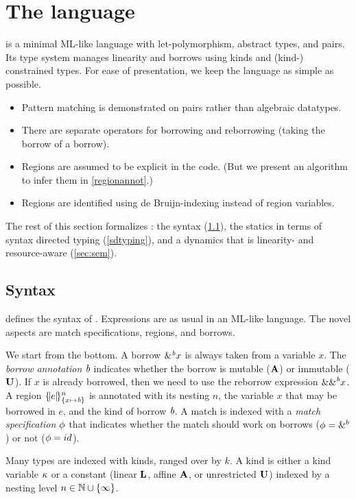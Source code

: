 \section{The \lang language}

\lang is a minimal ML-like language with
let-polymorphism, abstract types, and pairs. Its type system manages
linearity and borrows using kinds and (kind-) constrained types.
For ease of presentation, we keep the language as simple as possible.
\begin{itemize}
\item Pattern matching is demonstrated on pairs rather than algebraic
  datatypes.
\item There are separate operators for borrowing and reborrowing (taking
  the borrow of a borrow).
\item Regions are assumed to be explicit in the code. (But we present
  an algorithm to infer them in \cref{regionannot}.)
\item Regions are identified using de Bruijn-indexing instead of region
  variables. 
\end{itemize}

The rest of this section formalizes  \lang: the syntax (\cref{syntax}),
the statics in terms of syntax directed typing (\cref{sdtyping}),
and a dynamics that is linearity- and resource-aware (\cref{sec:sem}).

\subsection{Syntax}
\label{syntax}


 defines the syntax of \lang. Expressions are as usual
in an ML-like language.  The novel aspects are match
specifications, regions, and borrows.

We start from the bottom.
A borrow $\borrow{x}$ is always taken from a variable $x$. The
\emph{borrow annotation} $\BORROW$ indicates whether the borrow is mutable
($\MBORROW$) or immutable ($\IBORROW$). If $x$ is already borrowed,
then we need to use the reborrow expression $\reborrow{x}$.
%
A region $\region{\Sone x\BORROW}{e}$ is annotated with its nesting $n$, the variable $x$ that may be borrowed in $e$, and the kind of borrow $\BORROW$.
%
A match is indexed with a \emph{match specification} $\etransfm$ that indicates
whether the match should work on borrows ($\etransfm=\&^b$) or not ($\etransfm=id$).

Many types are indexed with kinds, ranged over by $k$.
A kind is either a kind variable $\kvar$ or a constant
(linear $\klin$, affine $\kaff$, or unrestricted $\kun$) indexed
by a nesting level $n \in \Nat \cup \{\infty\}$.

